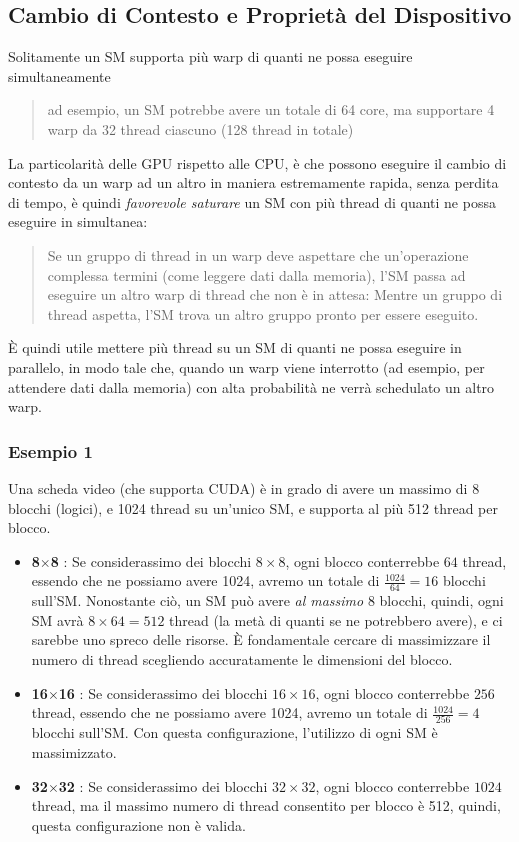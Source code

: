 \documentclass[10pt, letterpaper]{report}
\begin{document}
\subsection{Cambio di Contesto e Proprietà del Dispositivo}
Solitamente un SM supporta più warp di quanti ne possa eseguire simultaneamente \begin{quote}
    ad esempio, un SM potrebbe avere un totale di 64 core, ma supportare 4 warp da 32 thread ciascuno (128 thread in totale)
\end{quote}
La particolarità delle GPU rispetto alle CPU, è che possono eseguire il cambio di contesto da un warp ad un altro in maniera estremamente rapida, senza perdita di tempo, è quindi \textit{favorevole saturare} un SM con più thread di quanti ne possa eseguire in simultanea:\begin{quote}
    Se un gruppo di thread in un warp deve aspettare che un'operazione complessa termini (come leggere dati dalla memoria), l'SM passa ad eseguire un altro warp di thread che non è in attesa: Mentre un gruppo di thread aspetta, l'SM trova un altro gruppo pronto per essere eseguito.
\end{quote}
È quindi utile mettere più thread su un SM di quanti ne possa eseguire in parallelo, in modo tale che, quando un warp viene interrotto (ad esempio, per attendere dati dalla memoria) con alta probabilità ne verrà schedulato un altro warp.
\subsubsection{Esempio 1}
Una scheda video (che supporta CUDA) è in grado di avere un massimo di 8 blocchi (logici), e 1024 thread su un'unico SM, e supporta al più 512 thread per blocco.\begin{itemize}
    \item \textbf{8$\times$8} :  Se considerassimo dei blocchi $8\times 8$, ogni blocco conterrebbe $64$ thread, essendo che ne possiamo avere 1024, avremo un totale di $\frac{1024}{64}=16$ blocchi sull'SM. Nonostante ciò, un SM può avere \textit{al massimo} 8 blocchi, quindi, ogni SM avrà $8\times 64=512$ thread (la metà di quanti se ne potrebbero avere), e ci sarebbe uno spreco delle risorse. È fondamentale cercare di massimizzare il numero di thread scegliendo accuratamente le dimensioni del blocco.
    \item \textbf{16$\times$16} : Se considerassimo dei blocchi $16\times 16$, ogni blocco conterrebbe $256$ thread, essendo che ne possiamo avere 1024, avremo un totale di $\frac{1024}{256}=4$ blocchi sull'SM. Con questa configurazione, l'utilizzo di ogni SM è massimizzato.
    \item \textbf{32$\times$32} : Se considerassimo dei blocchi $32\times 32$, ogni blocco conterrebbe $1024$ thread, ma il massimo numero di thread consentito per blocco è 512, quindi, questa configurazione non è valida.
\end{itemize}
\end{document}
